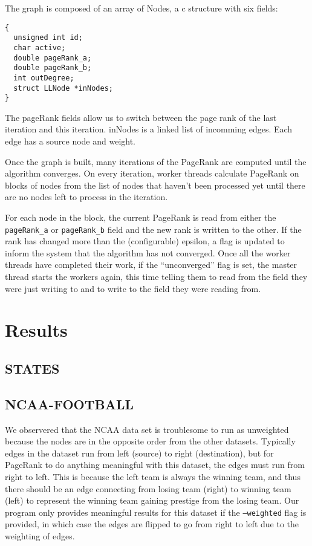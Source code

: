 \documentclass[draft]{report}
\begin{document}
The graph is composed of an array of Nodes, a c structure with six fields:
\begin{lstlisting}[lang=ANSI]
{
  unsigned int id;
  char active;
  double pageRank_a;
  double pageRank_b;
  int outDegree;
  struct LLNode *inNodes;
}
\end{lstlisting}

The pageRank fields allow us to switch between the page rank of the last
iteration and this iteration. inNodes is a linked list of incomming edges. Each
edge has a source node and weight.

Once the graph is built, many iterations of the PageRank are computed until the
algorithm converges. On every iteration, worker threads calculate PageRank
on blocks of nodes from the list of nodes that haven't been processed yet until
there are no nodes left to process in the iteration.

For each node in the block, the current PageRank is read from either the
\texttt{pageRank\_a} or \texttt{pageRank\_b} field and the new rank is written
to the other. If the rank has changed more than the (configurable) epsilon, a
flag is updated to inform the system that the algorithm has not converged. Once
all the worker threads have completed their work, if the ``unconverged'' flag is
set, the master thread starts the workers again, this time telling them to read
from the field they were just writing to and to write to the field they were
reading from.

\section{Results}
\subsection{STATES}

\subsection{NCAA-FOOTBALL}
We observered that the NCAA data set is troublesome to run as unweighted because
the nodes are in the opposite order from the other datasets. Typically edges in
the dataset run from left (source) to right (destination), but for PageRank to
do anything meaningful with this dataset, the edges must run from right to left.
This is because the left team is always the winning team, and thus there should
be an edge connecting from losing team (right) to winning team (left) to
represent the winning team gaining prestige from the losing team. Our program
only provides meaningful results for this dataset if the \texttt{--weighted}
flag is provided, in which case the edges are flipped to go from right to left
due to the weighting of edges.
\end{document}
